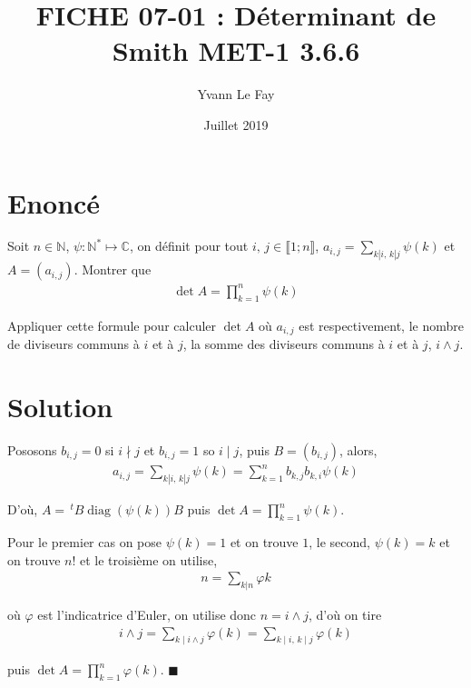 \documentclass{article}
\newcommand*{\QED}{\hfill\ensuremath{\blacksquare}}%
\DeclareMathOperator{\diag}{diag}
\begin{document}
\title{FICHE 07-01 : Déterminant de Smith MET-1 3.6.6}
\author{Yvann Le Fay}
\date{Juillet 2019}
\maketitle
\section*{Enoncé}
Soit $n\in\mathbb{N}$, $\psi : \mathbb{N}^* \mapsto \mathbb{C}$, on définit pour tout $i,\,j\in\llbracket 1;n\rrbracket$, $a_{i,j}=\sum_{k|i,\,k|j}\psi(k)$ et $A=(a_{i,j})$. Montrer que
\begin{align*}
\det A =\prod_{k=1}^n \psi(k)
\end{align*}

Appliquer cette formule pour calculer $\det A$ où $a_{i,j}$ est respectivement, le nombre de diviseurs communs à $i$ et à $j$, la somme des diviseurs communs à $i$ et à $j$, $i\wedge j$.
\section*{Solution}
Pososons $b_{i,j} = 0$ si $i\nmid j$ et $b_{i,j}=1$ so $i\mid j$, puis $B=(b_{i,j})$, alors,
\begin{align*}
a_{i,j}=\sum_{k|i,\,k|j}{\psi(k)}=\sum_{k=1}^n b_{k,j}b_{k,i}\psi(k)
\end{align*}

D'où, $A=\,^{t}B\diag(\psi(k))B$ puis $\det A = \prod_{k=1}^{n}\psi(k)$.

Pour le premier cas on pose $\psi(k)=1$ et on trouve $1$, le second, $\psi(k)=k$ et on trouve $n!$ et le troisième on utilise,
\begin{align*}
n = \sum_{k|n}\varphi{k}
\end{align*}

où $\varphi$ est l'indicatrice d'Euler, on utilise donc $n=i \wedge j$, d'où on tire
\begin{align*}
i\wedge j =\sum_{k\mid i\wedge j}\varphi(k) = \sum_{k\mid i,\,k\mid j}\varphi(k)
\end{align*}

puis $\det A = \prod_{k=1}^n \varphi(k)$.
\QED
\end{document}
